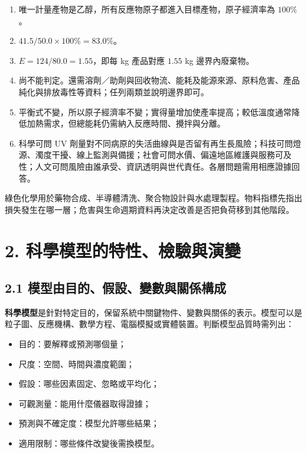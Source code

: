\documentclass[11pt,a4paper]{article}
\providecommand{\tightlist}{%
  \setlength{\itemsep}{0pt}\setlength{\parskip}{0pt}}
\begin{document}
\begin{enumerate}
\def\labelenumi{\arabic{enumi}.}
\tightlist
\item
  唯一計量產物是乙醇，所有反應物原子都進入目標產物，原子經濟率為 \(100\%\)。
\item
  \(41.5/50.0\times100\%=83.0\%\)。
\item
  \(E=124/80.0=1.55\)，即每 kg 產品對應 \(1.55\) kg 邊界內廢棄物。
\item
  尚不能判定。還需溶劑／助劑與回收物流、能耗及能源來源、原料危害、產品純化與排放毒性等資料；任列兩類並說明邊界即可。
\item
  平衡式不變，所以原子經濟率不變；實得量增加使產率提高；較低溫度通常降低加熱需求，但總能耗仍需納入反應時間、攪拌與分離。
\item
  科學可問 UV 劑量對不同病原的失活曲線與是否留有再生長風險；科技可問燈源、濁度干擾、線上監測與備援；社會可問水價、偏遠地區維護與服務可及性；人文可問風險由誰承受、資訊透明與世代責任。各層問題需用相應證據回答。
\end{enumerate}

綠色化學用於藥物合成、半導體清洗、聚合物設計與水處理製程。物料指標先指出損失發生在哪一層；危害與生命週期資料再決定改善是否把負荷移到其他階段。

\section{2. 科學模型的特性、檢驗與演變}\label{ux79d1ux5b78ux6a21ux578bux7684ux7279ux6027ux6aa2ux9a57ux8207ux6f14ux8b8a}

\subsection{2.1 模型由目的、假設、變數與關係構成}\label{ux6a21ux578bux7531ux76eeux7684ux5047ux8a2dux8b8aux6578ux8207ux95dcux4fc2ux69cbux6210}

\textbf{科學模型}是針對特定目的，保留系統中關鍵物件、變數與關係的表示。模型可以是粒子圖、反應機構、數學方程、電腦模擬或實體裝置。判斷模型品質時需列出：

\begin{itemize}
\tightlist
\item
  目的：要解釋或預測哪個量；
\item
  尺度：空間、時間與濃度範圍；
\item
  假設：哪些因素固定、忽略或平均化；
\item
  可觀測量：能用什麼儀器取得證據；
\item
  預測與不確定度：模型允許哪些結果；
\item
  適用限制：哪些條件改變後需換模型。
\end{itemize}
\end{document}

